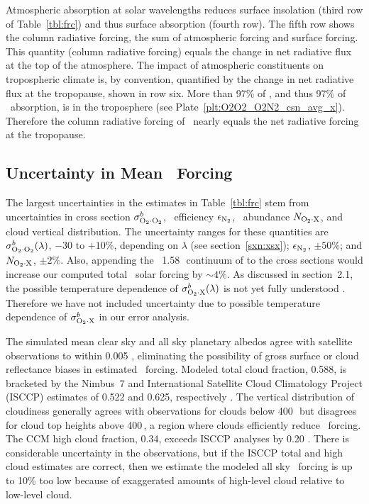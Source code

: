 \documentclass[agupp,twoside]{aguplus} %
\begin{document}
Atmospheric absorption at solar wavelengths reduces surface
insolation (third row of Table~\ref{tbl:frc}) and thus surface
absorption (fourth row). 
The fifth row shows the column radiative forcing, the sum of
atmospheric forcing and surface forcing.
This quantity  (column radiative forcing) equals the change in net
radiative flux at the top of the atmosphere.
The impact of atmospheric constituents on tropospheric climate is, by 
convention, quantified by the change in net radiative flux at the
tropopause, shown in row six.
More than 97\% of \OdX, and thus 97\% of \OdX\ absorption, is in the 
troposphere (see Plate~\ref{plt:O2O2_O2N2_csn_avg_x}).
Therefore the column radiative forcing of \OdX\ nearly equals the net
radiative forcing at the tropopause.

\subsection{Uncertainty in Mean \OdX\ Forcing}\label{sxn:err}  
The largest uncertainties in the estimates in Table~\ref{tbl:frc} stem
from uncertainties in cross section $\sigma^{b}_{\mathrm{O}_{2} \cdot \mathrm{O}_{2}}$, \Nd\ efficiency
$\epsilon_{\mathrm{N}_{2}}$, \OdX\ abundance $N_{\mathrm{O}_{2} \cdot \mathrm{X}}$, and cloud vertical distribution.
The uncertainty ranges for these quantities are $\sigma^{b}_{\mathrm{O}_{2} \cdot \mathrm{O}_{2}}(\lambda)$,
$-30$ to $+10\%$, depending on $\lambda$ (see section~\ref{sxn:xsx});
$\epsilon_{\mathrm{N}_{2}}$, $\pm 50\%$; and $N_{\mathrm{O}_{2} \cdot \mathrm{X}}$, $\pm 2\%$. 
Also, appending the \OdOd\ 1.58\,\um\ continuum of \cite{MCB98} to the 
\cite{SPS98} cross sections would increase our computed total
\OdX\ solar forcing by $\sim 4\%$.
As discussed in section~2.1, the possible temperature dependence of 
$\sigma^{b}_{\mathrm{O}_{2} \cdot \mathrm{X}}(\lambda)$ is not yet fully understood
\cite[]{GOB90,NeB98,OFH98}.     
Therefore we have not included uncertainty due to possible temperature
dependence of $\sigma^{b}_{\mathrm{O}_{2} \cdot \mathrm{X}}$ in our error analysis.

The simulated mean clear sky and all sky planetary albedos agree with
satellite observations to within 0.005 \cite[]{HKH98}, eliminating the
possibility of gross surface or cloud reflectance biases in estimated
\OdX\ forcing.
Modeled total cloud fraction, 0.588, is bracketed by the Nimbus~7 and 
International Satellite Cloud Climatology Project (ISCCP) estimates of
0.522 and 0.625, respectively \cite[]{HKH98}. 
The vertical distribution of cloudiness generally agrees with
observations for clouds below 400\,\mb\ but disagrees for cloud top
heights above 400\,\mb, a region where clouds efficiently reduce \OdX\
forcing.  
The CCM high cloud fraction, 0.34, exceeds ISCCP analyses by 0.20
\cite[]{HKH98}.  
There is considerable uncertainty in the observations, but if the
ISCCP total and high cloud estimates are correct, then we estimate the
modeled all sky \OdX\ forcing is up to 10\% too low because of
exaggerated amounts of high-level cloud relative to low-level cloud. 
\end{document}

